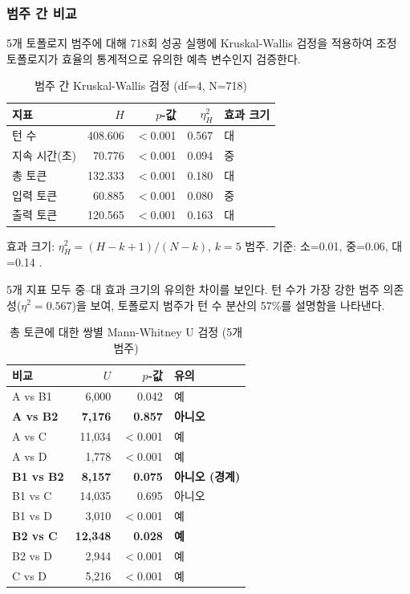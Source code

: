 \subsubsection{범주 간 비교}

5개 토폴로지 범주에 대해 718회 성공 실행에 Kruskal-Wallis 검정을 적용하여 조정 토폴로지가 효율의 통계적으로 유의한 예측 변수인지 검증한다.

\begin{table}[H]
\centering
\caption{범주 간 Kruskal-Wallis 검정 (df=4, N=718)}
\label{tab:kw-cross-cat}
{\small
\begin{tabular}{lrrrl}
\toprule
지표 & $H$ & $p$-값 & $\eta^{2}_{H}$ & 효과 크기 \\
\midrule
턴 수        & 408.606 & $<$0.001 & 0.567 & 대 \\
지속 시간(초) & 70.776  & $<$0.001 & 0.094 & 중 \\
총 토큰      & 132.333 & $<$0.001 & 0.180 & 대 \\
입력 토큰    & 60.885  & $<$0.001 & 0.080 & 중 \\
출력 토큰    & 120.565 & $<$0.001 & 0.163 & 대 \\
\bottomrule
\end{tabular}
}

\smallskip
{\footnotesize 효과 크기: $\eta^{2}_{H} = (H - k + 1) / (N - k)$, $k=5$ 범주. 기준: 소=0.01, 중=0.06, 대=0.14 \citep{cohen1988}.}
\end{table}

5개 지표 모두 중--대 효과 크기의 유의한 차이를 보인다. 턴 수가 가장 강한 범주 의존성($\eta^{2}=0.567$)을 보여, 토폴로지 범주가 턴 수 분산의 57\%를 설명함을 나타낸다.

\begin{table}[H]
\centering
\caption{총 토큰에 대한 쌍별 Mann-Whitney U 검정 (5개 범주)}
\label{tab:pairwise-mwu}
{\small
\begin{tabular}{lrrl}
\toprule
비교 & $U$ & $p$-값 & 유의 \\
\midrule
A vs B1           & 6,000  & 0.042   & 예 \\
\textbf{A vs B2}  & \textbf{7,176}  & \textbf{0.857} & \textbf{아니오} \\
A vs C            & 11,034 & $<$0.001 & 예 \\
A vs D            & 1,778  & $<$0.001 & 예 \\
\textbf{B1 vs B2} & \textbf{8,157}  & \textbf{0.075} & \textbf{아니오 (경계)} \\
B1 vs C           & 14,035 & 0.695   & 아니오 \\
B1 vs D           & 3,010  & $<$0.001 & 예 \\
\textbf{B2 vs C}  & \textbf{12,348} & \textbf{0.028} & \textbf{예} \\
B2 vs D           & 2,944  & $<$0.001 & 예 \\
C vs D            & 5,216  & $<$0.001 & 예 \\
\bottomrule
\end{tabular}
}
\end{table}

